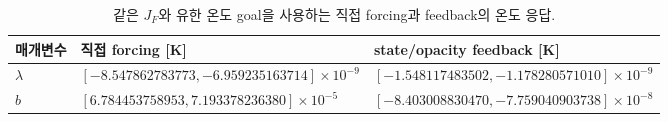 \begin{table}[htbp]\centering\small
\caption{같은 $J_F$와 유한 온도 goal을 사용하는 직접 forcing과 feedback의 온도 응답.}\label{tab:forcing}
\begin{tabular}{lll}\toprule
매개변수 & 직접 forcing [K] & state/opacity feedback [K]\\\midrule
$\lambda$ & $[-8.547862783773,-6.959235163714]\times10^{-9}$ & $[-1.548117483502,-1.178280571010]\times10^{-9}$\\
$b$ & $[6.784453758953,7.193378236380]\times10^{-5}$ & $[-8.403008830470,-7.759040903738]\times10^{-8}$\\
\bottomrule\end{tabular}\end{table}
